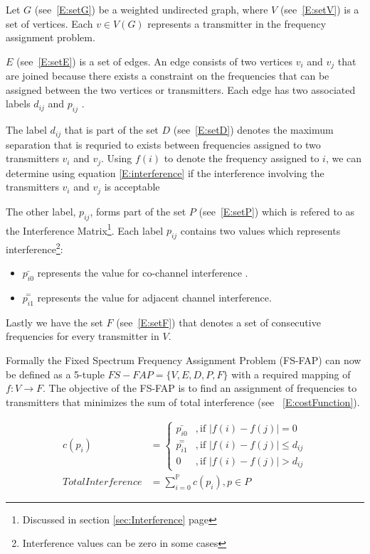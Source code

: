 Let $G$ (see~\ref{E:setG}) be a weighted undirected graph, where $V$ (see~\ref{E:setV}) is a set of vertices. Each $v \in V(G)$ represents a transmitter in the frequency assignment problem. 

$E$ (see~\ref{E:setE}) is a set of edges. An edge consists of two vertices $v_i$ and $v_j$ that are joined because there exists a constraint on the frequencies that can be assigned between the two vertices or transmitters. Each edge has two associated labels $d_{ij}$ and $p_{ij}$ \cite{FAPOrientationModel,TabuMontemanniSmith}. 

The label $d_{ij}$ that is part of the set $D$ (see~\ref{E:setD}) denotes the maximum separation that is requried to exists between frequencies assigned to two transmitters $v_i$ and $v_j$. Using $f(i)$ to denote the frequency assigned to $i$, we can determine using equation \ref{E:interference} if the interference involving the transmitters $v_i$ and $v_j$ is acceptable\cite{FAPOrientationModel,TabuMontemanniSmith}

The other label, $p_{ij}$, forms part of the set $P$ (see~\ref{E:setP}) which is refered to as the Interference Matrix\footnote{Discussed in section \ref{sec:Interference} page \pageref{sec:Interference}}. Each label $p_{ij}$ contains two values which represents interference\footnote{Interference values can be zero in some cases}:
\begin{itemize}
\item $\bar{p_{i0}}$ represents the value for co-channel interference \cite{FAPOrientationModel,TabuMontemanniSmith}. 
\item $\overset{=}{p_{i1}}$ represents the value for adjacent channel interference\cite{FAPOrientationModel,TabuMontemanniSmith}.
\end{itemize}

Lastly we have the set $F$ (see~\ref{E:setF}) that denotes a set of consecutive frequencies for every transmitter in $V$\cite{FAPOrientationModel,TabuMontemanniSmith}.

Formally the Fixed Spectrum Frequency Assignment Problem (FS-FAP) can now be defined as a 5-tuple \(FS-FAP = \{V,E,D,P,F\}\) with a required mapping of \(f: V \rightarrow F\)\cite{TabuMontemanniSmith}. The objective of the FS-FAP is to find an assignment of frequencies to transmitters that minimizes the sum of total interference (see ~\ref{E:costFunction}).

\begin{align} 
 c(p_i) &= 
 \begin{cases}
	\bar{p_{i0}} &,\text{if $|f(i) - f(j)| = 0$}\\
	\overset{=}{p_{i1}} &, \text{if $|f(i) - f(j)| \leqslant d_{ij}$}\\
	0 &,\text{if $|f(i) - f(j)| > d_{ij}$}
 \end{cases}\\
 Total Interference &= \sum^\mathbb{P}_{i = 0}c(p_i),p \in P \label{E:costFunction}
\end{align}

